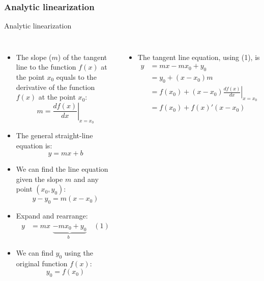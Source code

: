 \subsubsection{Analytic linearization}
\begin{frame}{Analytic linearization}
\begin{columns}
\begin{itemize}
    \item The slope ($m$) of the tangent line to the function $f(x)$ at the point $x_0$ equals to the derivative of the function $f(x)$ at the point $x_0$:
\[
m = \left. \frac{df(x)}{dx} \right|_{x = x_0}
\]

\item The general straight-line equation is:
\[
y = mx + b 
\]

\item We can find the line equation given the slope \( m \) and any point \( (x_0, y_0) \):
\[
y - y_0 = m(x - x_0) 
\]

\item Expand and rearrange:
\[
\begin{aligned}
y &= mx \underset{b}{\,\,\underbrace{-mx_0 + y_0}} \quad (1)
\end{aligned}
\]

\item We can find \( y_0 \) using the original function \( f(x) \):
\[
y_0 = f(x_0)
\]
\end{itemize}

\begin{itemize}
    \item The tangent line equation, using (1), is
    \[
\begin{aligned}
y &= mx - mx_0 + y_0 \\
  &= y_0 + (x - x_0)m \\
  &= f(x_0) + (x - x_0) \left. \frac{df(x)}{dx} \right|_{x = x_0} \\
  &= f(x_0) + f(x)'(x - x_0)
\end{aligned}
\]
\end{itemize}

\end{columns}
\end{frame}

